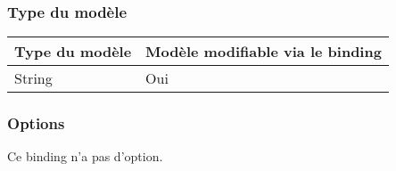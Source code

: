 \subsubsection{Type du modèle}

\begin{tabular}{|l|l|}
\hline
\textbf{Type du modèle} & \textbf{Modèle modifiable via le binding}\\
\hline
String & Oui\\
\hline
\end{tabular}
\subsubsection{Options}

Ce binding n'a pas d'option.
















